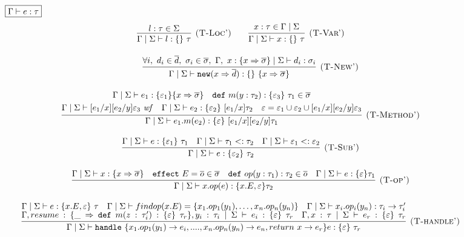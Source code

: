 \documentclass{article}
\theoremstyle{definition}
\newcommand{\keywadj}[1]{\mathtt{#1}}
\newcommand{\keyw}[1]{\keywadj{#1}~}
\begin{document}
\begin{figure}[H]
\footnotesize{
\noindent$\fbox{$\Gamma \vdash e : \tau$}$
\[
\begin{array}{c}

\infer[\textsc{(T-Loc')}]
  {\Gamma \mid \Sigma \vdash l : \{ \}~\tau}
  {l:\tau \in \Sigma } \quad \quad 
  
\infer[\textsc{(T-Var')}]
  {\Gamma \mid \Sigma \vdash x : \{ \}~\tau}
  {x : \tau \in \Gamma \mid \Sigma} \\[3ex]
~~~~~~~
\infer[\textsc{(T-New')}]
	{\Gamma \mid \Sigma \vdash \keywadj{new} (x \Rightarrow \overline{d}) : \{ \}~\{ x \Rightarrow \overline{\sigma} \}}
	{\forall i,~d_i \in \overline{d},~\sigma_i \in \overline{\sigma},~\Gamma,~x : \{ x \Rightarrow \overline{\sigma} \} \mid \Sigma \vdash d_i : \sigma_i}\\[3ex]
\infer[\textsc{(T-Method')}]
  {\Gamma \mid \Sigma \vdash e_1.m(e_2) : \{ \varepsilon \}~[e_1/x][e_2/y]\tau_1}
  {\begin{gathered} \Gamma \mid \Sigma \vdash e_1 : \{ \varepsilon_1 \} \{ x \Rightarrow \overline{\sigma} \}\quad \keyw{def} m(y : \tau_2) : \{ \varepsilon_3 \}~\tau_1 \in \overline{\sigma}\\
  \Gamma \mid \Sigma \vdash [e_1/x][e_2/y]\varepsilon_3~\mathit{wf}\quad \Gamma \mid \Sigma \vdash e_2 : \{ \varepsilon_2 \}~[e_1/x]\tau_2 \quad \varepsilon = \varepsilon_1 \cup \varepsilon_2 \cup [e_1/x][e_2/y]\varepsilon_3 \end{gathered}}\\[3ex]

\infer[\textsc{(T-Sub')}]
  {\Gamma \mid \Sigma \vdash e : \{ \varepsilon_2 \}~\tau_2}
  {\Gamma \mid \Sigma \vdash e : \{ \varepsilon_1 \}~\tau_1 & \Gamma \mid \Sigma \vdash \tau_1 <: \tau_2 & \Gamma \mid \Sigma \vdash \varepsilon_1 <: \varepsilon_2} \\[3ex]

\infer[\textsc{(T-op')}]
  {\Gamma \mid \Sigma \vdash x.op(e): \{x.E, \varepsilon\} \tau _2}
  {\Gamma \mid \Sigma \vdash x:  \{x \Rightarrow \overline{\sigma}\} \quad
   \keyw{effect} E = \overline{o} \in \overline{\sigma} \quad 
   \keyw{def} op(y: \tau_1): \tau_2 \in \overline{o} \quad 
   \Gamma \mid \Sigma \vdash e: \{\varepsilon \} \tau_1
  }
  \\[3ex]
  
  \infer[\textsc{(T-handle')}]
  {\Gamma \mid \Sigma \vdash \keyw{handle} \{x_1.op_1(y_1)\rightarrow e_i, ...., x_n.op_n(y_n)\rightarrow e_n, return\ x\rightarrow e_r\} e: \{\varepsilon\}\ \tau_r }
  {\Gamma \mid \Sigma \vdash e: \{x.E, \varepsilon\}\ \tau \quad 
  \Gamma \mid \Sigma \vdash findop(x.E) = \{ x_1.op_1(y_1), \dots, x_n.op_n(y_n)\} \quad
   \Gamma \mid \Sigma \vdash x_i.op_i(y_n) : \tau_i \rightarrow \tau_i'\\  
   \Gamma, resume: \{\_ \Rightarrow \keyw{def} m(z: \tau_i') : \{\varepsilon\}\ \tau_r\} , y_i:\tau_i \mid \Sigma \vdash e_i: \{\varepsilon\}\ \tau_r \quad \Gamma, x:\tau \mid \Sigma \vdash e_r: \{\varepsilon\}\ \tau_r
  }\\[3ex]
  

\end{array}\]}
\end{figure}
\end{document}
